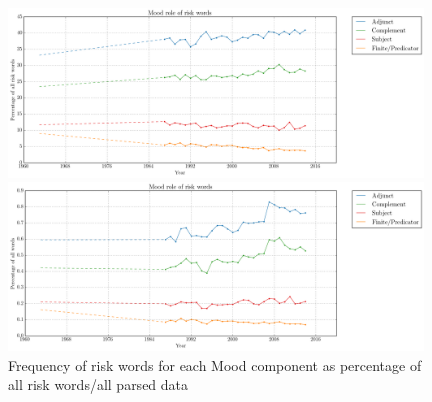     \noindent
    \begin{figure}[htb!]
    \centering
    \begin{minipage}{.48\textwidth}
    \centering
    \includegraphics[width=0.98\textwidth]{../images/mood_role_of_risk_words_old.png}
    \end{minipage}%
    \begin{minipage}{.48\textwidth}
    \centering
    \includegraphics[width=0.98\textwidth]{../images/riskdep_allwords.png}
    \end{minipage}
    \caption[Frequency of risk words for each Mood component]{Frequency of risk words for each Mood component as percentage of all risk words\slash all parsed data}
    \label{fig:interpersonalarg}
    \end{figure}



